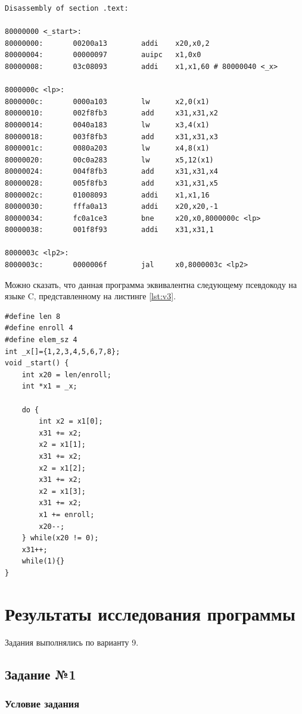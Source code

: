 \begin{lstlisting}[label=lst:v2,caption=Дизассемблированный код примера программы]
Disassembly of section .text:

80000000 <_start>:
80000000:       00200a13        addi    x20,x0,2
80000004:       00000097        auipc   x1,0x0
80000008:       03c08093        addi    x1,x1,60 # 80000040 <_x>

8000000c <lp>:
8000000c:       0000a103        lw      x2,0(x1)
80000010:       002f8fb3        add     x31,x31,x2
80000014:       0040a183        lw      x3,4(x1)
80000018:       003f8fb3        add     x31,x31,x3
8000001c:       0080a203        lw      x4,8(x1)
80000020:       00c0a283        lw      x5,12(x1)
80000024:       004f8fb3        add     x31,x31,x4
80000028:       005f8fb3        add     x31,x31,x5
8000002c:       01008093        addi    x1,x1,16
80000030:       fffa0a13        addi    x20,x20,-1
80000034:       fc0a1ce3        bne     x20,x0,8000000c <lp>
80000038:       001f8f93        addi    x31,x31,1

8000003c <lp2>:
8000003c:       0000006f        jal     x0,8000003c <lp2>
\end{lstlisting}

\clearpage

Можно сказать, что данная программа эквивалентна следующему псевдокоду на языке C, представленному на листинге \ref{lst:v3}.

\begin{lstlisting}[label=lst:v3,caption=Псевдокод общей программы]
#define len 8
#define enroll 4
#define elem_sz 4
int _x[]={1,2,3,4,5,6,7,8};
void _start() {
	int x20 = len/enroll;
	int *x1 = _x;
	
	do {
		int x2 = x1[0];
		x31 += x2;
		x2 = x1[1];
		x31 += x2;
		x2 = x1[2];
		x31 += x2;
		x2 = x1[3];
		x31 += x2;
		x1 += enroll;
		x20--;
	} while(x20 != 0);
	x31++;
	while(1){}
}
\end{lstlisting}

\chapter{Результаты исследования программы}
Задания выполнялись по варианту 9.

\section{Задание №1}

\subsection*{Условие задания}

